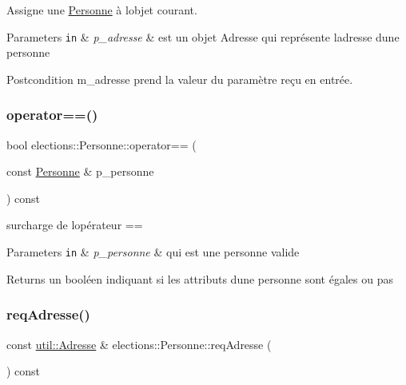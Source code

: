 Assigne une \hyperlink{classelections_1_1Personne}{Personne} à l\textquotesingle{}objet courant. 


\begin{DoxyParams}[1]{Parameters}
\mbox{\tt in}  & {\em p\+\_\+adresse} & est un objet Adresse qui représente l\textquotesingle{}adresse d\textquotesingle{}une personne \\
\hline
\end{DoxyParams}
\begin{DoxyPostcond}{Postcondition}
m\+\_\+adresse prend la valeur du paramètre reçu en entrée. 
\end{DoxyPostcond}
\mbox{\label{classelections_1_1Personne_a991bb78bcf3a7ea7574d7d991c7595d9}} 
\subsubsection{\texorpdfstring{operator==()}{operator==()}}
{\footnotesize\ttfamily bool elections\+::\+Personne\+::operator== (\begin{DoxyParamCaption}\item[{const \hyperlink{classelections_1_1Personne}{Personne} \&}]{p\+\_\+personne }\end{DoxyParamCaption}) const}



surcharge de l\textquotesingle{}opérateur == 


\begin{DoxyParams}[1]{Parameters}
\mbox{\tt in}  & {\em p\+\_\+personne} & qui est une personne valide \\
\hline
\end{DoxyParams}
\begin{DoxyReturn}{Returns}
un booléen indiquant si les attributs d\textquotesingle{}une personne sont égales ou pas 
\end{DoxyReturn}
\mbox{\label{classelections_1_1Personne_a908c8e2362d6b3bbbc6c24f8f7a4e460}} 
\subsubsection{\texorpdfstring{req\+Adresse()}{reqAdresse()}}
{\footnotesize\ttfamily const \hyperlink{classutil_1_1Adresse}{util\+::\+Adresse} \& elections\+::\+Personne\+::req\+Adresse (\begin{DoxyParamCaption}{ }\end{DoxyParamCaption}) const}



